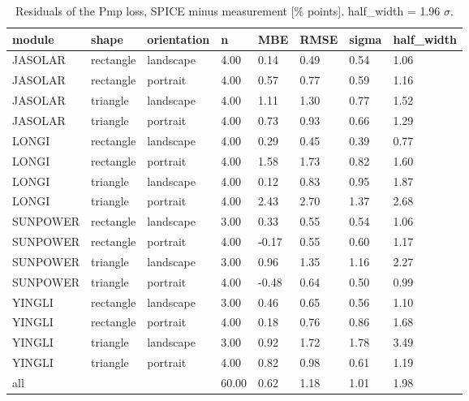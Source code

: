 \begin{table}[htbp]
\centering
\caption{Residuals of the Pmp loss, SPICE minus measurement [\% points]. half\_width = 1.96 $\sigma$.}
\label{tab:residuals_pmp}
\begin{tabular}{@{}llllllll@{}}
\toprule
module & shape & orientation & n & MBE & RMSE & sigma & half\_width \\
\midrule
JASOLAR & rectangle & landscape & 4.00 & 0.14 & 0.49 & 0.54 & 1.06 \\
JASOLAR & rectangle & portrait & 4.00 & 0.57 & 0.77 & 0.59 & 1.16 \\
JASOLAR & triangle & landscape & 4.00 & 1.11 & 1.30 & 0.77 & 1.52 \\
JASOLAR & triangle & portrait & 4.00 & 0.73 & 0.93 & 0.66 & 1.29 \\
LONGI & rectangle & landscape & 4.00 & 0.29 & 0.45 & 0.39 & 0.77 \\
LONGI & rectangle & portrait & 4.00 & 1.58 & 1.73 & 0.82 & 1.60 \\
LONGI & triangle & landscape & 4.00 & 0.12 & 0.83 & 0.95 & 1.87 \\
LONGI & triangle & portrait & 4.00 & 2.43 & 2.70 & 1.37 & 2.68 \\
SUNPOWER & rectangle & landscape & 3.00 & 0.33 & 0.55 & 0.54 & 1.06 \\
SUNPOWER & rectangle & portrait & 4.00 & -0.17 & 0.55 & 0.60 & 1.17 \\
SUNPOWER & triangle & landscape & 3.00 & 0.96 & 1.35 & 1.16 & 2.27 \\
SUNPOWER & triangle & portrait & 4.00 & -0.48 & 0.64 & 0.50 & 0.99 \\
YINGLI & rectangle & landscape & 3.00 & 0.46 & 0.65 & 0.56 & 1.10 \\
YINGLI & rectangle & portrait & 4.00 & 0.18 & 0.76 & 0.86 & 1.68 \\
YINGLI & triangle & landscape & 3.00 & 0.92 & 1.72 & 1.78 & 3.49 \\
YINGLI & triangle & portrait & 4.00 & 0.82 & 0.98 & 0.61 & 1.19 \\
all &  &  & 60.00 & 0.62 & 1.18 & 1.01 & 1.98 \\
\bottomrule
\end{tabular}
\end{table}
